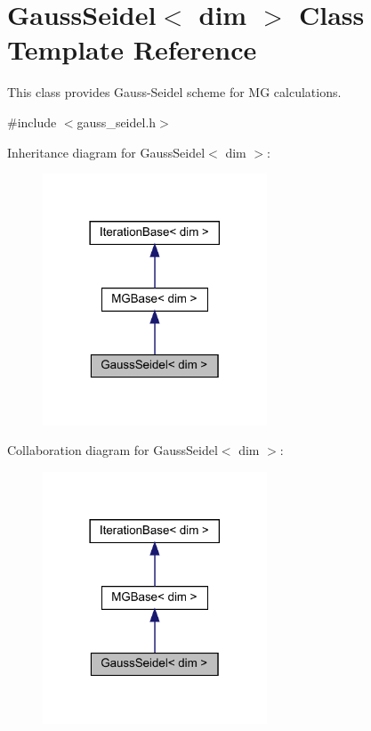 \hypertarget{class_gauss_seidel}{}\section{Gauss\+Seidel$<$ dim $>$ Class Template Reference}
\label{class_gauss_seidel}


This class provides Gauss-\/\+Seidel scheme for MG calculations.  




{\ttfamily \#include $<$gauss\+\_\+seidel.\+h$>$}



Inheritance diagram for Gauss\+Seidel$<$ dim $>$\+:\nopagebreak
\begin{figure}[H]
\begin{center}
\leavevmode
\includegraphics[width=189pt]{class_gauss_seidel__inherit__graph}
\end{center}
\end{figure}


Collaboration diagram for Gauss\+Seidel$<$ dim $>$\+:\nopagebreak
\begin{figure}[H]
\begin{center}
\leavevmode
\includegraphics[width=189pt]{class_gauss_seidel__coll__graph}
\end{center}
\end{figure}
